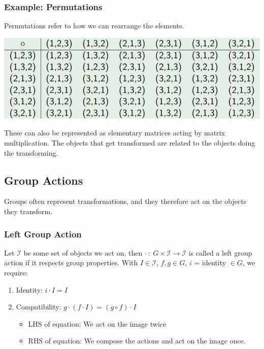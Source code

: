 \documentclass[10pt]{article}
\begin{document}
\subsubsection*{Example: Permutations}
Permutations refer to how we can rearrange the elements.
\begin{center}
    \includegraphics[scale=0.8]{W5_3.png}
\end{center}
These can also be represented as elementary matrices acting by matrix multiplication.  The objects that get transformed are related to the objects doing the transforming.

\subsection*{Group Actions}
Groups often represent transformations, and they therefore act on the objects they transform.
\subsubsection*{Left Group Action}
Let $\mathcal{I}$ be some set of objects we act on, then $\cdot \::\: G \times \mathcal{I} \rightarrow \mathcal{I}$ is called a left group action if it respects group properties.  With $I \in \mathcal{I}$, $f, g \in G$, $i$ = identity $\in G$, we require:
\begin{enumerate}
    \item Identity: $i \cdot I = I$
    \item Compatibility: $ g \cdot (f \cdot I) = (g \circ f) \cdot I$
    \begin{itemize}
        \item LHS of equation: We act on the image twice
        \item RHS of equation: We compose the actions and act on the image once.
    \end{itemize}
\end{enumerate}
\end{document}
